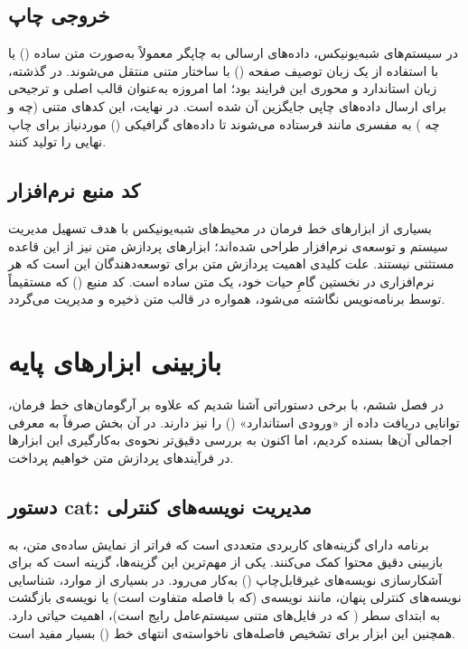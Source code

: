 \subsection{خروجی چاپ}

در سیستم‌های شبه‌یونیکس، داده‌های ارسالی به چاپگر معمولاً به‌صورت متن ساده () یا با استفاده از یک زبان توصیف صفحه () با ساختار متنی منتقل می‌شوند. در گذشته،  زبان استاندارد و محوری این فرایند بود؛ اما امروزه  به‌عنوان قالب اصلی و ترجیحی برای ارسال داده‌های چاپی جایگزین آن شده است. در نهایت، این کدهای متنی (چه  و چه ) به مفسری مانند  فرستاده می‌شوند تا داده‌های گرافیکی () موردنیاز برای چاپ نهایی را تولید کنند.

\subsection{کد منبع نرم‌افزار}

بسیاری از ابزارهای خط فرمان در محیط‌های شبه‌یونیکس با هدف تسهیل مدیریت سیستم و توسعه‌ی نرم‌افزار طراحی شده‌اند؛ ابزارهای پردازش متن نیز از این قاعده مستثنی نیستند. علت کلیدی اهمیت پردازش متن برای توسعه‌دهندگان این است که هر نرم‌افزاری در نخستین گامِ حیات خود، یک متن ساده است. کد منبع () که مستقیماً توسط برنامه‌نویس نگاشته می‌شود، همواره در قالب متن ذخیره و مدیریت می‌گردد.

\section{بازبینی ابزارهای پایه}

در فصل ششم، با برخی دستوراتی آشنا شدیم که علاوه بر آرگومان‌های خط فرمان، توانایی دریافت داده از «ورودی استاندارد» () را نیز دارند. در آن بخش صرفاً به معرفی اجمالی آن‌ها بسنده کردیم، اما اکنون به بررسی دقیق‌تر نحوه‌ی به‌کارگیری این ابزارها در فرآیندهای پردازش متن خواهیم پرداخت.

\subsection{دستور cat: مدیریت نویسه‌های کنترلی}

برنامه  دارای گزینه‌های کاربردی متعددی است که فراتر از نمایش ساده‌ی متن، به بازبینی دقیق محتوا کمک می‌کنند. یکی از مهم‌ترین این گزینه‌ها، گزینه  است که برای آشکارسازی نویسه‌های غیرقابل‌چاپ () به‌کار می‌رود. در بسیاری از موارد، شناسایی نویسه‌های کنترلی پنهان، مانند نویسه‌ی  (که با فاصله متفاوت است) یا نویسه‌ی بازگشت به ابتدای سطر ( که در فایل‌های متنی سیستم‌عامل  رایج است)، اهمیت حیاتی دارد. همچنین این ابزار برای تشخیص فاصله‌های ناخواسته‌ی انتهای خط () بسیار مفید است.

